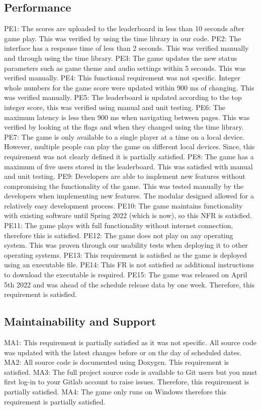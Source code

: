 \documentclass[12pt, titlepage]{article}
\begin{document}
\subsection{Performance}
PE1: The scores are uploaded to the leaderboard in less than 10 seconds after game play. This was verified by using the time library in our code. 
PE2: The interface has a response time of less than 2 seconds. This was verified manually and through using the time library.   
PE3: The game updates the new status parameters such as game theme and audio settings within 5 seconds. This was verified manually. 
PE4: This functional requirement was not specific. Integer whole numbers for the game score were updated within 900 ms of changing. This was verified manually. 
PE5: The leaderboard is updated according to the top integer score, this was verified using manual and unit testing. 
PE6: The maximum latency is less then 900 ms when navigating between pages. This was verified by looking at the flags and when they changed using the time library. 
PE7: The game is only available to a single player at a time on a local device. However, multiple people can play the game on different local devices. Since, this requirement was not clearly defined it is partially satisfied. 
PE8: The game has a maximum of five users stored in the leaderboard. This was satisfied with manual and unit testing.
PE9: Developers are able to implement new features without compromising the functionality of the game. This was tested manually by the developers when implementing new features. The modular designed allowed for a relatively easy development process. 
PE10: The game maintains functionality with existing software until Spring 2022 (which is now), so this NFR is satisfied. 
PE11: The game plays with full functionality without internet connection, therefore this is satisfied. 
PE12: The game does not play on any operating system. This was proven through our usability tests when deploying it to other operating systems. 
PE13: This requirement is satisfied as the game is deployed using an executable file. 
PE14: This FR is not satisfied as additional instructions to download the executable is required. 
PE15: The game was released on April 5th 2022 and was ahead of the schedule release data by one week. Therefore, this requirement is satisfied. 

\subsection{Maintainability and Support}
MA1: This requirement is partially satisfied as it was not specific. All source code was updated with the latest changes before or on the day of scheduled dates. 
MA2: All source code is documented using Doxygen. This requirement is satisfied. 
MA3: The full project source code is available to Git users but you must first log-in to your Gitlab account to raise issues. Therefore, this requirement is partially satisfied. 
MA4: The game only runs on Windows therefore this requirement is partially satisfied. 
\end{document}
